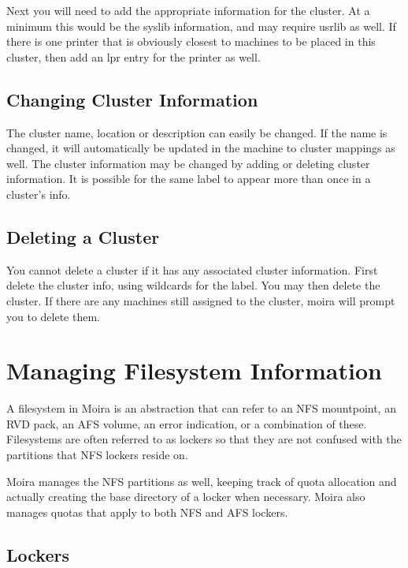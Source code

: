Next you will need to add the appropriate information for the cluster.
At a minimum this would be the syslib information, and may require
usrlib as well.  If there is one printer that is obviously closest to
machines to be placed in this cluster, then add an lpr entry for the
printer as well.  

\subsection{Changing Cluster Information}
The cluster name, location or description can easily be changed.  If
the name is changed, it will automatically be updated in the machine
to cluster mappings as well.  The cluster information may be changed
by adding or deleting cluster information.  It is possible for the
same label to appear more than once in a cluster's info.

\subsection{Deleting a Cluster}
You cannot delete a cluster if it has any associated cluster
information.   First delete the cluster info, using wildcards for the
label.  You may then delete the cluster.  If there are any machines
still assigned to the cluster, moira will prompt you to delete them.

\section{Managing Filesystem Information}

A filesystem in Moira is an abstraction that can refer to an NFS
mountpoint, an RVD pack, an AFS volume, an error indication, or a
combination of these.  Filesystems are often referred to as lockers so
that they are not confused with the partitions that NFS lockers reside
on.

Moira manages the NFS partitions as well, keeping track of quota
allocation and actually creating the base directory of a locker when
necessary.  Moira also manages quotas that apply to both NFS and AFS
lockers.

\subsection{Lockers}

